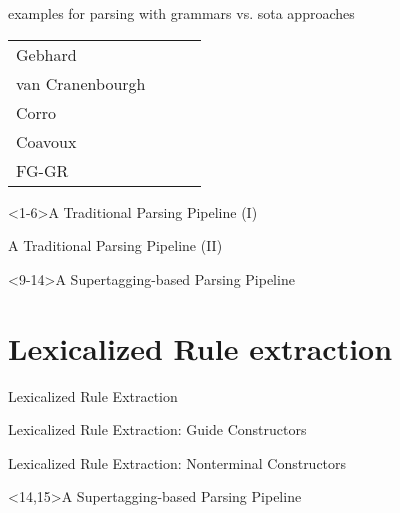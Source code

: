 \documentclass[aspectratio=169, 10pt]{beamer}
\begin{document}
\begin{frame}
        examples for parsing with grammars vs. sota approaches
        \begin{tabular}{lccc}
            \toprule
            \midrule
            Gebhard\\
            van Cranenbourgh\\
            \midrule
            Corro\\
            Coavoux\\
            FG-GR\\
            \bottomrule
        \end{tabular}
    \end{frame}

    \begin{frame}<1-6>{A Traditional Parsing Pipeline (I)}
        \resizebox{\linewidth}{!}{}
    \end{frame}

    \begin{frame}{A Traditional Parsing Pipeline (II)}
        \centering
        
    \end{frame}

    \begin{frame}<9-14>{A Supertagging-based Parsing Pipeline}
        \resizebox{\linewidth}{!}{}
    \end{frame}


    \section{Lexicalized Rule extraction}
    \begin{frame}{Lexicalized Rule Extraction}
        \resizebox{\linewidth}{!}{}
    \end{frame}

    \begin{frame}{Lexicalized Rule Extraction: Guide Constructors}
    \end{frame}

    \begin{frame}{Lexicalized Rule Extraction: Nonterminal Constructors}
    \end{frame}


    \begin{frame}<14,15>{A Supertagging-based Parsing Pipeline}
        \resizebox{\linewidth}{!}{}
    \end{frame}
\end{document}
